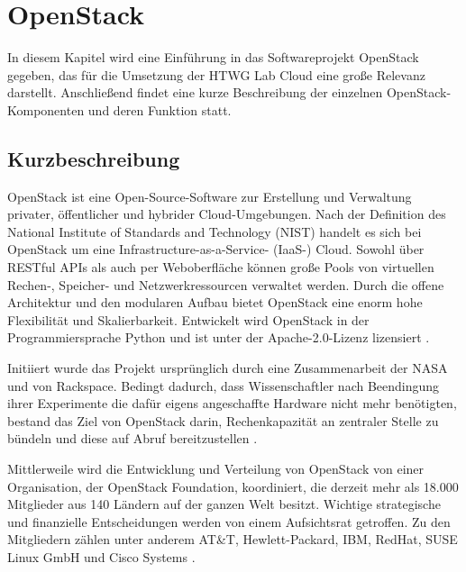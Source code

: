 \chapter{OpenStack}

In diesem Kapitel wird eine Einführung in das Softwareprojekt OpenStack gegeben, das für die Umsetzung der HTWG Lab Cloud eine große Relevanz darstellt. Anschließend findet eine kurze Beschreibung der einzelnen OpenStack-Komponenten und deren Funktion statt.

\section{Kurzbeschreibung}OpenStack ist eine Open-Source-Software zur Erstellung und Verwaltung privater, öffentlicher und hybrider Cloud-Umgebungen. Nach der Definition des National Institute of Standards and Technology (NIST) handelt es sich bei OpenStack um eine Infrastructure-as-a-Service- (IaaS-) Cloud. Sowohl über RESTful APIs als auch per Weboberfläche können große Pools von virtuellen Rechen-, Speicher- und Netzwerkressourcen verwaltet werden. Durch die offene Architektur und den modularen Aufbau bietet OpenStack eine enorm hohe Flexibilität und Skalierbarkeit. Entwickelt wird OpenStack in der Programmiersprache Python und ist unter der Apache-2.0-Lizenz lizensiert \cite[vgl.][S. 7ff]{Beitter}. 

Initiiert wurde das Projekt ursprünglich durch eine Zusammenarbeit der NASA und von Rackspace. Bedingt dadurch, dass Wissenschaftler nach Beendingung ihrer Experimente die dafür eigens angeschaffte Hardware nicht mehr benötigten, bestand das Ziel von OpenStack darin, Rechenkapazität an zentraler Stelle zu bündeln und diese auf Abruf bereitzustellen \cite[vgl.][]{Loschwitz}.

Mittlerweile wird die Entwicklung und Verteilung von OpenStack von einer Organisation, der OpenStack Foundation, koordiniert, die derzeit mehr als 18.000 Mitglieder aus 140 Ländern auf der ganzen Welt besitzt. Wichtige strategische und finanzielle Entscheidungen werden von einem Aufsichtsrat getroffen. Zu den Mitgliedern zählen unter anderem AT\&T, Hewlett-Packard, IBM, RedHat, SUSE Linux GmbH und Cisco Systems \cite[vgl.][]{OpenStackFoundation}.

